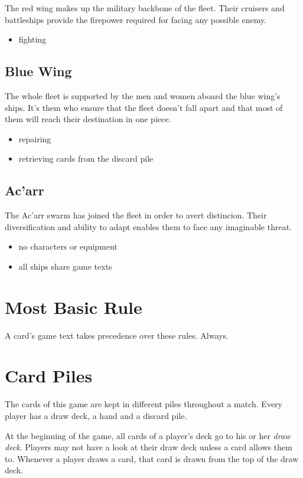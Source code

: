 \documentclass[11pt, a4paper]{article}
\begin{document}
The red wing makes up the military backbone of the fleet. Their cruisers and
battleships provide the firepower required for facing any possible enemy.

\begin{itemize}
 \item fighting
\end{itemize}

\subsection{Blue Wing}

The whole fleet is supported by the men and women aboard the blue wing's ships.
It's them who ensure that the fleet doesn't fall apart and that most of them
will reach their destination in one piece.

\begin{itemize}
 \item repairing
 \item retrieving cards from the discard pile
\end{itemize}

\subsection{Ac'arr}

The Ac'arr swarm has joined the fleet in order to avert distincion. Their
diversification and ability to adapt enables them to face any imaginable threat.

\begin{itemize}
 \item no characters or equipment
 \item all ships share game texts
\end{itemize}

\section{Most Basic Rule}

A card's game text takes precedence over these rules. Always.

\section{Card Piles}

The cards of this game are kept in different piles throughout a match. Every
player has a draw deck, a hand and a discard pile.

At the beginning of the game, all cards of a player's deck go to his or her
\emph{draw deck}. Players may not have a look at their draw deck unless a card
allows them to. Whenever a player draws a card, that card is drawn from the top
of the draw deck.
\end{document}
